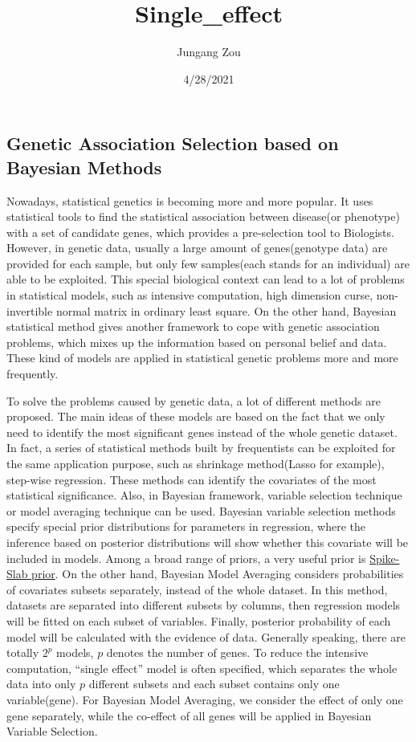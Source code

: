 \documentclass[
]{article}
\title{Single\_effect}
\author{Jungang Zou}
\date{4/28/2021}
\begin{document}
\maketitle

\hypertarget{genetic-association-selection-based-on-bayesian-methods}{%
\subsection{Genetic Association Selection based on Bayesian
Methods}\label{genetic-association-selection-based-on-bayesian-methods}}

Nowadays, statistical genetics is becoming more and more popular. It
uses statistical tools to find the statistical association between
disease(or phenotype) with a set of candidate genes, which provides a
pre-selection tool to Biologists. However, in genetic data, usually a
large amount of genes(genotype data) are provided for each sample, but
only few samples(each stands for an individual) are able to be
exploited. This special biological context can lead to a lot of problems
in statistical models, such as intensive computation, high dimension
curse, non-invertible normal matrix in ordinary least square. On the
other hand, Bayesian statistical method gives another framework to cope
with genetic association problems, which mixes up the information based
on personal belief and data. These kind of models are applied in
statistical genetic problems more and more frequently.

To solve the problems caused by genetic data, a lot of different methods
are proposed. The main ideas of these models are based on the fact that
we only need to identify the most significant genes instead of the whole
genetic dataset. In fact, a series of statistical methods built by
frequentists can be exploited for the same application purpose, such as
shrinkage method(Lasso for example), step-wise regression. These methods
can identify the covariates of the most statistical significance. Also,
in Bayesian framework, variable selection technique or model averaging
technique can be used. Bayesian variable selection methods specify
special prior distributions for parameters in regression, where the
inference based on posterior distributions will show whether this
covariate will be included in models. Among a broad range of priors, a
very useful prior is
\href{https://en.wikipedia.org/wiki/Spike-and-slab_regression}{Spike-Slab
prior}. On the other hand, Bayesian Model Averaging considers
probabilities of covariates subsets separately, instead of the whole
dataset. In this method, datasets are separated into different subsets
by columns, then regression models will be fitted on each subset of
variables. Finally, posterior probability of each model will be
calculated with the evidence of data. Generally speaking, there are
totally \(2^p\) models, \(p\) denotes the number of genes. To reduce the
intensive computation, ``single effect'' model is often specified, which
separates the whole data into only \(p\) different subsets and each
subset contains only one variable(gene). For Bayesian Model Averaging,
we consider the effect of only one gene separately, while the co-effect
of all genes will be applied in Bayesian Variable Selection.
\end{document}
